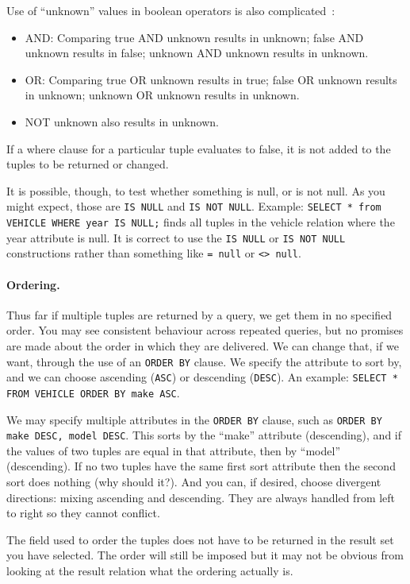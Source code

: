 \documentclass[a4paper]{report}
\begin{document}
Use of ``unknown'' values in boolean operators is also complicated~\cite{dsc}:

\begin{itemize}
	\item  AND: Comparing true AND unknown results in unknown; false AND unknown results in false; unknown AND unknown results in unknown.
	\item OR: Comparing true OR unknown results in true; false OR unknown results in unknown; unknown OR unknown results in unknown.
	\item NOT unknown also results in unknown.
\end{itemize}

If a where clause for a particular tuple evaluates to false, it is not added to the tuples to be returned or changed. 

It is possible, though, to test whether something is null, or is not null. As you might expect, those are \texttt{IS NULL} and \texttt{IS NOT NULL}. Example: \texttt{SELECT * from VEHICLE WHERE year IS NULL;} finds all tuples in the vehicle relation where the year attribute is null. It is correct to use the \texttt{IS NULL} or \texttt{IS NOT NULL} constructions rather than something like \texttt{= null} or \texttt{<> null}.


\paragraph{Ordering.} Thus far if multiple tuples are returned by a query, we get them in no specified order. You may see consistent behaviour across repeated queries, but no promises are made about the order in which they are delivered. We can change that, if we want, through the use of an \texttt{ORDER BY} clause. We specify the attribute to sort by, and we can choose ascending (\texttt{ASC}) or descending (\texttt{DESC}). An example: \texttt{SELECT * FROM VEHICLE ORDER BY make ASC}.

We may specify multiple attributes in the \texttt{ORDER BY} clause, such as \texttt{ORDER BY make DESC, model DESC}. This sorts by the ``make'' attribute (descending), and if the values of two tuples are equal in that attribute, then by ``model'' (descending). If no two tuples have the same first sort attribute then the second sort does nothing (why should it?). And you can, if desired, choose divergent directions: mixing ascending and descending. They are always handled from left to right so they cannot conflict.

The field used to order the tuples does not have to be returned in the result set you have selected. The order will still be imposed but it may not be obvious from looking at the result relation what the ordering actually is.
\end{document}
